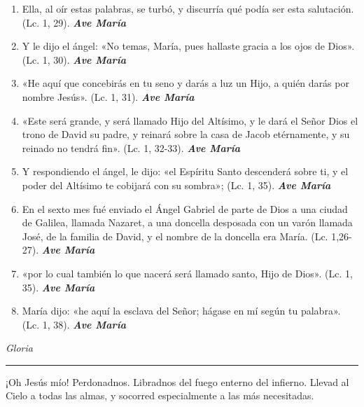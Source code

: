 \documentclass[a4paper,11pt, oneside]{report}
\begin{document}
{{\begin{enumerate}
      \item Ella, al oír estas palabras, se turbó, y discurría qué podía ser esta salutación. (Lc. 1, 29). \textbf{\textit{Ave María}}

      \item Y le dijo el ángel: «No temas, María, pues hallaste gracia a los ojos de Dios». (Lc. 1, 30). \textbf{\textit{Ave María}}

      \item «He aquí que concebirás en tu seno y darás a luz un Hijo, a quién darás por nombre Jesús». (Lc. 1, 31). \textbf{\textit{Ave María}}

      \item «Este será grande, y será llamado Hijo del Altísimo, y le dará el Señor Dios el trono de David su padre, 
      y reinará sobre la casa de Jacob etérnamente, y su reinado no tendrá fin». (Lc. 1, 32-33). \textbf{\textit{Ave María}}

      \item Y respondiendo el ángel, le dijo: «el Espíritu Santo descenderá sobre ti, 
      y el poder del Altísimo te cobijará con su sombra»; (Lc. 1, 35). \textbf{\textit{Ave María}}

      \item En el sexto mes fué enviado el Ángel Gabriel de parte de Dios a una ciudad de Galilea, llamada Nazaret, a una 
      doncella desposada con un varón llamada José, de la familia de David, y el nombre de la doncella era María. (Lc. 1,26- 27). \textbf{\textit{Ave María}}

      \item «por lo cual también lo que nacerá será llamado santo, Hijo de Dios». (Lc. 1, 35). \textbf{\textit{Ave María}}

      \item María dijo: «he aquí la esclava del Señor; hágase en mí según tu palabra». (Lc. 1, 38). \textbf{\textit{Ave María}}
    \end{enumerate}
      
    \indent\textit{Gloria}

    \begin{center}\rule{1\linewidth}{\linethickness}\end{center}

    \hypertarget{finalAnunciacion}{¡Oh Jesús mío! Perdonadnos. Libradnos del fuego enterno del infierno. Llevad al Cielo a todas las almas, y socorred especialmente a las más 
    necesitadas.}
  }

}
\end{document}
